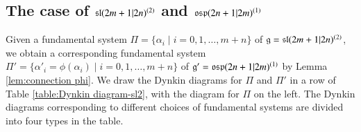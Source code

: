 \documentclass[12pt]{amsart}
\theoremstyle{definition}
\theoremstyle{remark}
\numberwithin{equation}{section}
\begin{document}
\subsection{The case of  ${{\rm\mathfrak{sl}}}(2m+1|2n)^{(2)}$ and ${{\rm\mathfrak{osp}}}(2n+1|2m)^{(1)}$ }\label{sect:sl-osp}
\setcounter{case}{0}
Given a fundamental system $\Pi=\{\alpha_i\mid i=0, 1, \dots, m+n\}$ of  ${{\mathfrak g}}={{\rm\mathfrak{sl}}}(2m+1|2n)^{(2)}$, we obtain a corresponding fundamental system $\Pi'=\{\alpha'_i=\phi(\alpha_i)\mid i=0, 1, \dots, m+n\}$ of  ${{\mathfrak g}}'={{\rm\mathfrak{osp}}}(2n+1|2m)^{(1)}$ by Lemma \ref{lem:connection phi}. We draw the Dynkin diagrams for $\Pi$ and $\Pi'$ in a row of Table \ref{table:Dynkin diagram-sl2}, with the diagram for $\Pi$ on the left. The Dynkin diagrams corresponding to different choices of fundamental systems are divided into four types in the table.
\end{document}

